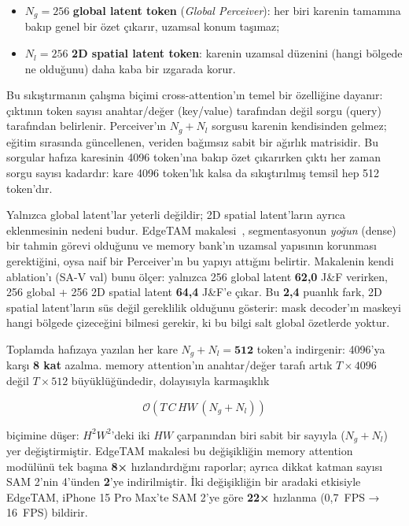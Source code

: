 \begin{itemize}
  \item $N_g{=}256$ \textbf{global latent token} (\emph{Global
        Perceiver}): her biri karenin tamamına bakıp genel bir özet
        çıkarır, uzamsal konum taşımaz;
  \item $N_l{=}256$ \textbf{2D spatial latent token}: karenin uzamsal
        düzenini (hangi bölgede ne olduğunu) daha kaba bir ızgarada
        korur.
\end{itemize}

Bu sıkıştırmanın çalışma biçimi cross-attention'ın temel bir özelliğine
dayanır: çıktının token sayısı anahtar/değer (key/value) tarafından
değil sorgu (query) tarafından belirlenir. Perceiver'ın $N_g{+}N_l$
sorgusu karenin kendisinden gelmez; eğitim sırasında güncellenen,
veriden bağımsız sabit bir ağırlık matrisidir. Bu sorgular hafıza
karesinin 4096 token'ına bakıp özet çıkarırken çıktı her zaman sorgu
sayısı kadardır: kare 4096 token'lık kalsa da sıkıştırılmış temsil hep
512 token'dır.

Yalnızca global latent'lar yeterli değildir; 2D spatial latent'ların
ayrıca eklenmesinin nedeni budur. EdgeTAM makalesi~\cite{zhou2025edgetam},
segmentasyonun \emph{yoğun} (dense) bir tahmin görevi olduğunu ve
memory bank'ın uzamsal yapısının korunması gerektiğini, oysa naif bir
Perceiver'ın bu yapıyı attığını belirtir. Makalenin kendi ablation'ı
(SA-V val) bunu ölçer: yalnızca 256 global latent \textbf{62,0} J\&F
verirken, 256 global + 256 2D spatial latent \textbf{64,4} J\&F'e
çıkar. Bu \textbf{2,4} puanlık fark, 2D spatial latent'ların süs değil
gereklilik olduğunu gösterir: mask decoder'ın maskeyi hangi bölgede
çizeceğini bilmesi gerekir, ki bu bilgi salt global özetlerde yoktur.

Toplamda hafızaya yazılan her kare $N_g{+}N_l{=}\mathbf{512}$ token'a
indirgenir: 4096'ya karşı \textbf{8 kat} azalma. memory attention'ın
anahtar/değer tarafı artık $T{\times}4096$ değil $T{\times}512$
büyüklüğündedir, dolayısıyla karmaşıklık

\begin{equation}
  \mathcal{O}(T \, C \, H W \, (N_g{+}N_l))
  \label{eq:edgetam-karmasiklik}
\end{equation}

biçimine düşer: $H^2W^2$'deki iki $HW$ çarpanından biri sabit bir sayıyla
($N_g{+}N_l$) yer değiştirmiştir. EdgeTAM makalesi bu değişikliğin
memory attention modülünü tek başına \textbf{8×} hızlandırdığını
raporlar; ayrıca dikkat katman sayısı SAM 2'nin 4'ünden \textbf{2}'ye
indirilmiştir. İki değişikliğin bir aradaki etkisiyle EdgeTAM, iPhone 15
Pro Max'te SAM 2'ye göre \textbf{22×} hızlanma (0,7~FPS → 16~FPS)
bildirir.


